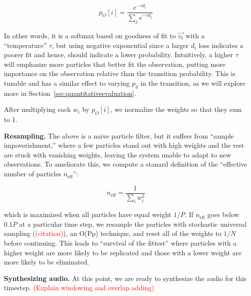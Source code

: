 \documentclass{article}
\newcommand{\ChrisEdit}[1]{\textcolor{red}{(#1)}}
\begin{document}
\begin{equation}
    \label{eq:observationprob}
    p_O[i] = \frac{e^{-\tau d_i}}{ \sum_{j} e^{-\tau d_j}}
\end{equation}

In other words, it is a softmax based on goodness of fit to $\vec{v_t}$ with a ``temperature'' $\tau$, but using negative exponential since a larger $d_i$ loss indicates a poorer fit and hence, should indicate a lower probability.  Intuitively, a higher $\tau$ will emphasize more particles that better fit the observation, putting more importance on the observation relative than the transition probability.  This is tunable and has a similar effect to varying $p_d$ in the transition, as we will explore more in Section~\ref{sec:quantitativeevaluation}.

After multiplying each $w_i$ by $p_O[i]$, we normalize the weights so that they sum to 1.  

\textbf{Resampling.} The above is a naive particle filter, but it suffers from ``sample impoverishment,'' where a few particles stand out with high weights and the rest are stuck with vanishing weights, leaving the system unable to adapt to new observations.  To ameliorate this, we compute a stanard definition of the ``effective number of particles $n_{\text{eff}}$'':

\begin{equation}
    n_{\text{eff}} = \frac{1}{\sum_{i} w_i^2}
\end{equation}


which is maximized when all particles have equal weight $1/P$.  If $n_{\text{eff}}$ goes below $0.1P$ at a particular time step, we resample the particles with stochastic universal sampling (\ChrisEdit{citation}), an O(Pp) technique, and reset all of the weights to $1/N$ before continuing.  This leads to ``survival of the fittest'' where particles with a higher weight are more likely to be replicated and those with a lower weight are more likely to be eliminated.

\textbf{Synthesizing audio.} At this point, we are ready to synthesize the audio for this timestep. \ChrisEdit{Explain windowing and overlap adding}


\end{document}
